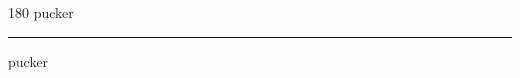 
\begin{frame}
\begin{center}
\begin{turn}{180}
{\fontsize{2.5cm}{1em}\selectfont pucker}
\end{turn}
\vspace{1em}\par  
\hrule
\vspace{1em}\par  
{\fontsize{2.5cm}{1em}\selectfont pucker}
\end{center}
\end{frame}
